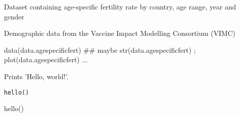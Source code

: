 \documentclass[a4paper]{book}
\begin{document}
%
\begin{Details}\relax
Dataset containing age-specific fertility rate by country, age range, year and gender
\end{Details}
%
\begin{Source}\relax
Demographic data from the Vaccine Impact Modelling Consortium (VIMC)
\end{Source}
%
\begin{Examples}
\begin{ExampleCode}
data(data.agespecificfert)
## maybe str(data.agespecificfert) ; plot(data.agespecificfert) ...
\end{ExampleCode}
\end{Examples}
%
\begin{Description}\relax
Prints 'Hello, world!'.
\end{Description}
%
\begin{Usage}
\begin{verbatim}
hello()
\end{verbatim}
\end{Usage}
%
\begin{Examples}
\begin{ExampleCode}
hello()
\end{ExampleCode}
\end{Examples}
\printindex{}
\end{document}
